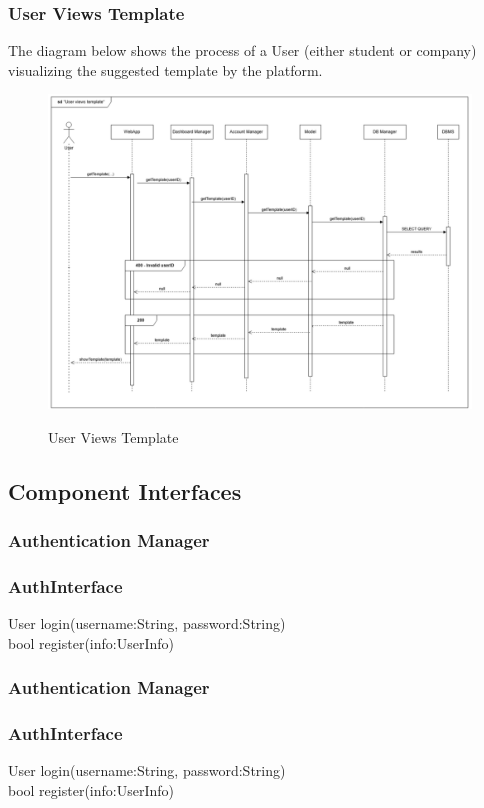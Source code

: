 \documentclass[a4paper,12pt]{article}
\begin{document}
\subsubsection*{User Views Template}
The diagram below shows the process of a User (either student or company) visualizing the suggested template by the platform.
\begin{figure}[H]
\centering
\includegraphics[scale = 0.5]{DD_figures/RuntimeView/UserViewsTemplateRV.png}\\
\caption{User Views Template}
\end{figure}
\newpage

\subsection{Component Interfaces}
\subsubsection{Authentication Manager}
\subsubsection*{AuthInterface}
User login(username:String, password:String)\\
bool register(info:UserInfo)

\subsubsection{Authentication Manager}
\subsubsection*{AuthInterface}
User login(username:String, password:String)\\
bool register(info:UserInfo)
\end{document}

